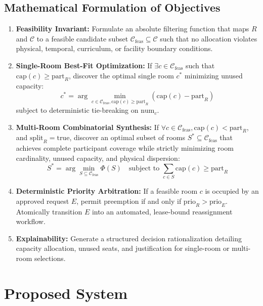 \documentclass[conference]{IEEEtran}
\begin{document}
\subsection{Mathematical Formulation of Objectives}
\begin{enumerate}
    \item \textbf{Feasibility Invariant:} Formulate an absolute filtering function that maps $R$ and $\mathcal{C}$ to a feasible candidate subset $\mathcal{C}_{\text{feas}} \subseteq \mathcal{C}$ such that no allocation violates physical, temporal, curriculum, or facility boundary conditions.
    \item \textbf{Single-Room Best-Fit Optimization:} If $\exists c \in \mathcal{C}_{\text{feas}}$ such that $\text{cap}(c) \ge \text{part}_R$, discover the optimal single room $c^*$ minimizing unused capacity:
    \begin{equation}
    c^* = \arg\min_{c \in \mathcal{C}_{\text{feas}}, \text{cap}(c) \ge \text{part}_R} \left( \text{cap}(c) - \text{part}_R \right)
    \end{equation}
    subject to deterministic tie-breaking on $\text{num}_c$.
    \item \textbf{Multi-Room Combinatorial Synthesis:} If $\forall c \in \mathcal{C}_{\text{feas}}, \text{cap}(c) < \text{part}_R$, and $\text{split}_R = \text{true}$, discover an optimal subset of rooms $S^* \subseteq \mathcal{C}_{\text{feas}}$ that achieves complete participant coverage while strictly minimizing room cardinality, unused capacity, and physical dispersion:
    \begin{equation}
    S^* = \arg\min_{S \subseteq \mathcal{C}_{\text{feas}}} \Phi(S) \quad \text{subject to } \sum_{c \in S} \text{cap}(c) \ge \text{part}_R
    \end{equation}
    \item \textbf{Deterministic Priority Arbitration:} If a feasible room $c$ is occupied by an approved request $E$, permit preemption if and only if $\text{prio}_R > \text{prio}_E$. Atomically transition $E$ into an automated, lease-bound reassignment workflow.
    \item \textbf{Explainability:} Generate a structured decision rationalization detailing capacity allocation, unused seats, and justification for single-room or multi-room selections.
\end{enumerate}

\section{Proposed System}
\end{document}
